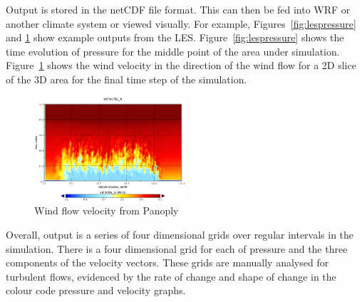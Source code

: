 Output is stored in the netCDF file format. This can then be fed into WRF or
another climate system or viewed visually. For example,
Figures~\ref{fig:lespressure} and \ref{fig:lesvelocity} show example outputs
from the LES. Figure~\ref{fig:lespressure} shows the time evolution of pressure
for the middle point of the area under simulation. Figure~\ref{fig:lesvelocity}
shows the wind velocity in the direction of the wind flow for a 2D slice of the
3D area for the final time step of the simulation.

\begin{figure}
    \includegraphics[width=0.5\textwidth]{graphs/velocity_x_in_LES_output_u.png}
    \caption{Wind flow velocity from Panoply}
    \label{fig:lesvelocity}
\end{figure}

Overall, output is a series of four dimensional grids over regular intervals in
the simulation. There is a four dimensional grid for each of pressure and the
three components of the velocity vectors. These grids are manually analysed for
turbulent flows, evidenced by the rate of change and shape of change in the
colour code pressure and velocity graphs.
